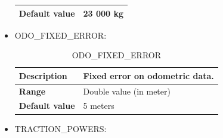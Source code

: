 \documentclass{template/openetcs}
\begin{document}
\begin{itemize}
\begin{longtable}{|l|l|}
				\hline
				
					\begin{minipage}[t]{0.22\linewidth} \textbf{Default value}	\end{minipage} 
				&	\begin{minipage}[t]{0.78\linewidth} 23 000 kg \end{minipage} \\
				
				\hline
				
			\end{longtable}

		\item ODO\_FIXED\_ERROR:
																															
			\begin{longtable}{|l|l|}
				\caption{ODO\_FIXED\_ERROR}\\ 
				\hline
				
					\begin{minipage}[t]{0.22\linewidth} \textbf{Description}	\end{minipage} 
				&	\begin{minipage}[t]{0.78\linewidth} Fixed error on odometric data. \end{minipage} \\
				
				\hline
																																									
					\begin{minipage}[t]{0.22\linewidth} \textbf{Range}	\end{minipage} 
				&	\begin{minipage}[t]{0.78\linewidth} Double value (in meter) \end{minipage} \\
				
				\hline
				
					\begin{minipage}[t]{0.22\linewidth} \textbf{Default value}	\end{minipage} 
				&	\begin{minipage}[t]{0.78\linewidth} 5 meters \end{minipage} \\
				
				\hline
				
			\end{longtable}
							
		\item TRACTION\_POWERS:
																															

\end{itemize}
\end{document}
